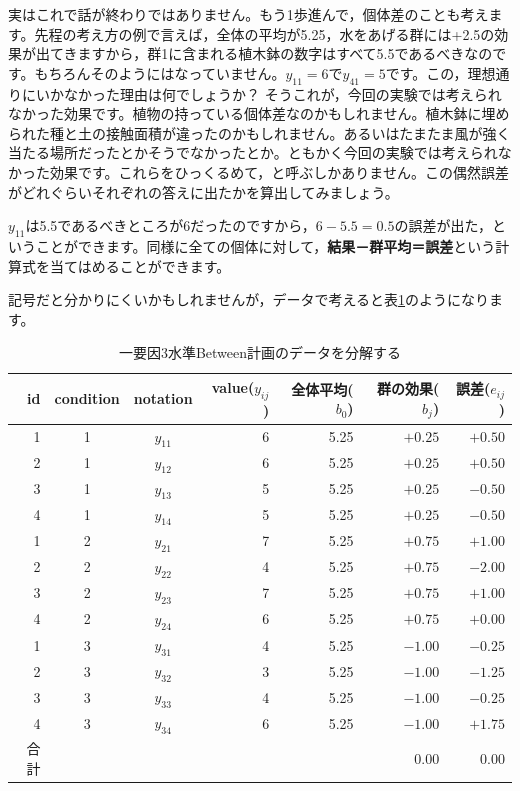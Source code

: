 \documentclass{ltjbook}
\begin{document}
実はこれで話が終わりではありません。もう1歩進んで，個体差のことも考えます。先程の考え方の例で言えば，全体の平均が5.25，水をあげる群には+2.5の効果が出てきますから，群1に含まれる植木鉢の数字はすべて5.5であるべきなのです。もちろんそのようにはなっていません。$y_{11} = 6$で$y_{41}=5$です。この，理想通りにいかなかった理由は何でしょうか？ そうこれが，今回の実験では考えられなかった効果です。植物の持っている個体差なのかもしれません。植木鉢に埋められた種と土の接触面積が違ったのかもしれません。あるいはたまたま風が強く当たる場所だったとかそうでなかったとか。ともかく今回の実験では考えられなかった効果です。これらをひっくるめて，と呼ぶしかありません。この偶然誤差がどれぐらいそれぞれの答えに出たかを算出してみましょう。

$y_{11}$は5.5であるべきところが6だったのですから，$6-5.5=0.5$の誤差が出た，ということができます。同様に全ての個体に対して，\textbf{結果－群平均＝誤差}という計算式を当てはめることができます。

記号だと分かりにくいかもしれませんが，データで考えると表\ref{table::21_03}のようになります。
\begin{table}[ht]
    \centering
    \caption{一要因3水準Between計画のデータを分解する}
    \begin{tabular}{rccrrrr}
      \hline
    id & condition & notation & value($y_{ij}$) & 全体平均($b_0$) & 群の効果($b_j$) & 誤差($e_{ij}$)\\ 
      \hline
      1 & 1 & $y_{11}$ & 6 & 5.25 & $+0.25$ & $+0.50$\\ 
      2 & 1 & $y_{12}$ & 6 & 5.25 & $+0.25$ & $+0.50$\\ 
      3 & 1 & $y_{13}$ & 5 & 5.25 & $+0.25$ & $-0.50$\\ 
      4 & 1 & $y_{14}$ & 5 & 5.25 & $+0.25$ & $-0.50$\\ 
      1 & 2 & $y_{21}$ & 7 & 5.25 & $+0.75$ & $+1.00$\\ 
      2 & 2 & $y_{22}$ & 4 & 5.25 & $+0.75$ & $-2.00$ \\ 
      3 & 2 & $y_{23}$ & 7 & 5.25 & $+0.75$ & $+1.00$\\ 
      4 & 2 & $y_{24}$ & 6 & 5.25 & $+0.75$ & $+0.00$\\ 
      1 & 3 & $y_{31}$ & 4 & 5.25 & $-1.00$ & $-0.25$\\ 
      2 & 3 & $y_{32}$ & 3 & 5.25 & $-1.00$ & $-1.25$\\ 
      3 & 3 & $y_{33}$ & 4 & 5.25 & $-1.00$ & $-0.25$\\ 
      4 & 3 & $y_{34}$ & 6 & 5.25 & $-1.00$ & $+1.75$\\ 
       \hline\hline
       合計 &&&&& 0.00 & 0.00\\\hline
    \end{tabular}
    \label{table::21_03}
    \end{table}
\end{document}
